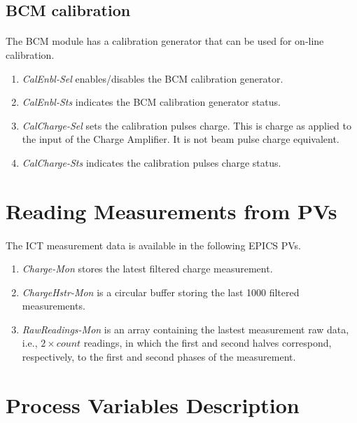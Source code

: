 \documentclass[openany]{article}
\begin{document}
	\subsection{BCM calibration}

		\paragraph{} The BCM module has a calibration generator that can be used for on-line calibration.

			\begin{enumerate}
			\item \emph{CalEnbl-Sel} enables/disables the BCM calibration generator.
			\item \emph{CalEnbl-Sts} indicates the BCM calibration generator status.
			\item \emph{CalCharge-Sel} sets the calibration pulses charge. This is charge as applied to the input of the Charge Amplifier. It is not beam pulse charge equivalent.
			\item \emph{CalCharge-Sts} indicates the calibration pulses charge status.
			\end{enumerate}

\section{Reading Measurements from PVs}

	\paragraph{} The ICT measurement data is available in the following EPICS PVs.

		\begin{enumerate}
		\item \emph{Charge-Mon} stores the latest filtered charge measurement.
		\item \emph{ChargeHstr-Mon} is a circular buffer storing the last 1000 filtered measurements.
		\item \emph{RawReadings-Mon} is an array containing the lastest measurement raw data, i.e., $ 2 \times count $ readings, in which the first and second halves correspond, respectively, to the first and second phases of the measurement.
		\end{enumerate}

\section{Process Variables Description}\label{sec:process-variables}
\end{document}

